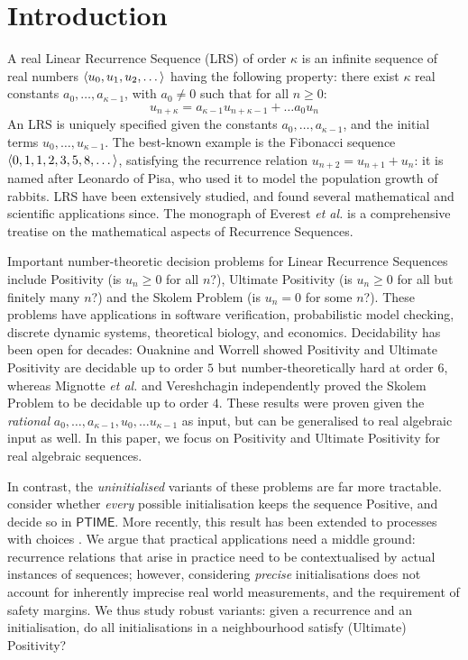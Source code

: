 \section{Introduction}
\label{section:intro}
A real Linear Recurrence Sequence (LRS) of order $\kappa$ is an infinite sequence of real numbers $\langle u_0, u_1, u_2, \dots\rangle$ having the following property: there exist $\kappa$ real constants $a_{0}, \dots, a_{\kappa-1}$, with $a_0 \ne 0$ such that for all $n \ge 0$:
\begin{equation}
u_{n+\kappa} = a_{\kappa-1}u_{n+\kappa-1} + \dots a_0 u_n
\end{equation}
An LRS is uniquely specified given the constants $a_0, \dots, a_{\kappa-1}$, and the initial terms $u_0, \dots, u_{\kappa-1}$. The best-known example is the Fibonacci sequence $\langle0, 1, 1, 2, 3, 5, 8, \dots\rangle$, satisfying the recurrence relation $u_{n+2} = u_{n+1} + u_n$: it is named after Leonardo of Pisa, who used it to model the population growth of rabbits. LRS have been extensively studied, and found several mathematical and scientific applications since. The monograph of Everest \textit{et al.} \cite{Everest2003RecurrenceS} is a comprehensive treatise on the mathematical aspects of Recurrence Sequences.

Important number-theoretic decision problems for Linear Recurrence Sequences include Positivity (is $u_n \ge 0$ for all $n$?), Ultimate Positivity (is $u_n \ge 0$ for all but finitely many $n$?) and the Skolem Problem (is $u_n = 0$ for some $n$?). These problems have applications in software verification, probabilistic model checking, discrete dynamic systems, theoretical biology, and economics. Decidability has been open for decades: Ouaknine and Worrell \cite{joeljames3} showed Positivity and Ultimate Positivity are decidable up to order $5$ but number-theoretically hard at order $6$, whereas Mignotte \textit{et al.} \cite{mignotte} and Vereshchagin \cite{vereshchagin} independently proved the Skolem Problem to be decidable up to order $4$. These results were proven given the \textit{rational} $a_0, \dots, a_{\kappa-1}, u_0, \dots u_{\kappa-1}$ as input, but can be generalised to real algebraic input as well. In this paper, we focus on Positivity and Ultimate Positivity for real algebraic sequences.

In contrast, the \textit{uninitialised} variants of these problems are far more tractable. \cite{Braverman06,Tiwari04} consider whether \textit{every} possible initialisation keeps the sequence Positive, and decide so in $\mathsf{PTIME}$. More recently, this result has been extended to processes with choices \cite{AGV18}. We argue that practical applications need a middle ground: recurrence relations that arise in practice need to be contextualised by actual instances of sequences; however, considering \textit{precise} initialisations does not account for inherently imprecise real world measurements, and the requirement of safety margins. We thus study robust variants: given a recurrence and an initialisation, do all initialisations in a neighbourhood satisfy (Ultimate) Positivity?

